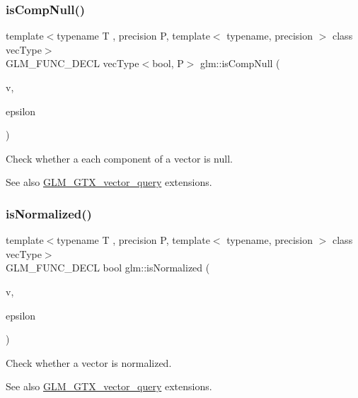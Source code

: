 \subsubsection{\texorpdfstring{is\+Comp\+Null()}{isCompNull()}}
{\footnotesize\ttfamily template$<$typename T , precision P, template$<$ typename, precision $>$ class vec\+Type$>$ \\
G\+L\+M\+\_\+\+F\+U\+N\+C\+\_\+\+D\+E\+CL vec\+Type$<$bool, P$>$ glm\+::is\+Comp\+Null (\begin{DoxyParamCaption}\item[{vec\+Type$<$ T, P $>$ const \&}]{v,  }\item[{T const \&}]{epsilon }\end{DoxyParamCaption})}

Check whether a each component of a vector is null. \begin{DoxySeeAlso}{See also}
\hyperlink{group__gtx__vector__query}{G\+L\+M\+\_\+\+G\+T\+X\+\_\+vector\+\_\+query} extensions. 
\end{DoxySeeAlso}
\mbox{\label{group__gtx__vector__query_ga6fa5fa2af67d14c205d24c49aad03270}} 
\subsubsection{\texorpdfstring{is\+Normalized()}{isNormalized()}}
{\footnotesize\ttfamily template$<$typename T , precision P, template$<$ typename, precision $>$ class vec\+Type$>$ \\
G\+L\+M\+\_\+\+F\+U\+N\+C\+\_\+\+D\+E\+CL bool glm\+::is\+Normalized (\begin{DoxyParamCaption}\item[{vec\+Type$<$ T, P $>$ const \&}]{v,  }\item[{T const \&}]{epsilon }\end{DoxyParamCaption})}

Check whether a vector is normalized. \begin{DoxySeeAlso}{See also}
\hyperlink{group__gtx__vector__query}{G\+L\+M\+\_\+\+G\+T\+X\+\_\+vector\+\_\+query} extensions. 
\end{DoxySeeAlso}
\mbox{\label{group__gtx__vector__query_ga81a64edc1a2b470b82896592e89c523b}} 
